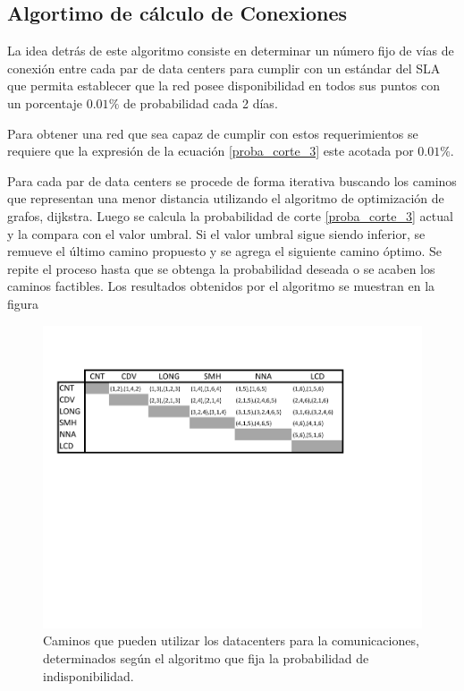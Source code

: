 \subsection{Algortimo de cálculo de Conexiones}
\label{sec:algoritmo_conex}

La idea detrás de este algoritmo consiste en determinar un número fijo de vías de conexión entre cada par de data centers para cumplir con un estándar del SLA que permita establecer que la red posee disponibilidad en todos sus puntos con un porcentaje $0.01 \%$ de probabilidad cada 2 días.

Para obtener una red que sea capaz de cumplir con estos requerimientos se requiere que la expresión de la ecuación \eqref{proba_corte_3} este acotada por $0.01\%$. 

Para cada par de data centers se procede de forma iterativa buscando los caminos que representan una menor distancia utilizando el algoritmo de optimización de grafos, dijkstra. Luego se calcula la probabilidad de corte \eqref{proba_corte_3} actual y la compara con el valor umbral. Si el valor umbral sigue siendo inferior, se remueve el último camino propuesto y se agrega el siguiente camino óptimo. Se repite el proceso hasta que se obtenga la probabilidad deseada o se acaben los caminos factibles.
Los resultados obtenidos por el algoritmo se muestran en la figura

\begin{figure}[H]
  \centering
  \includegraphics[width=13cm]{Imagenes/caminos}
  \caption{Caminos que pueden utilizar los datacenters para la comunicaciones, determinados según el algoritmo que fija la probabilidad de indisponibilidad.}
  \label{fig:caminos}
\end{figure}


